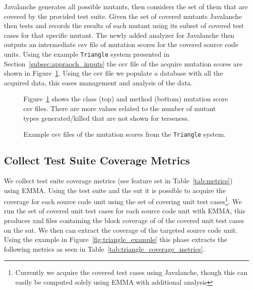 Javalanche generates all possible mutants, then considers the set of them that are covered by the provided test suite. Given the set of covered mutants Javalanche then tests and records the results of each mutant using its subset of covered test cases for that specific mutant. The newly added analyzer for Javalanche then outputs an intermediate \gls{csv} file of mutation scores for the covered source code units. Using the example \texttt{Triangle} system presented in Section~\ref{subsec:appraoch_inputs} the \gls{csv} file of the acquire mutation scores are shown in Figure~\ref{fig:triangle_mutation_scores}. Using the \gls{csv} file we populate a database with all the acquired data, this eases management and analysis of the data.

\begin{figure}[h]
  \centering
  
  
  \caption{Example \gls{csv} files of the mutation scores from the \texttt{Triangle} system.}
  \vspace{1mm}
  \footnotesize{Figure~\ref{fig:triangle_mutation_scores} shows the class (top) and method (bottom) mutation score \gls{csv} files. There are more values related to the number of mutant types generated/killed that are not shown for terseness.}
  \vspace{1mm}
  \label{fig:triangle_mutation_scores}
\end{figure}


\subsection{Collect Test Suite Coverage Metrics}
\label{subsec:appraoch_collect_coverage_metrics}
We collect test suite coverage metrics (see feature set  in Table~\ref{tab:metrics}) using EMMA. Using the test suite and the \gls{sut} it is possible to acquire the coverage for each source code unit using the set of covering unit test cases\footnote{Currently we acquire the covered test cases using Javalanche, though this can easily be computed solely using EMMA with additional analysis}. We run the set of covered unit test cases for each source code unit with EMMA, this produces \gls{xml} files containing the block coverage of of the covered unit test cases on the \gls{sut}. We then can extract the coverage of the targeted source code unit. Using the example in Figure~\ref{fig:triangle_example} this phase extracts the following metrics as seen in Table~\ref{tab:triangle_coverage_metrics}.


